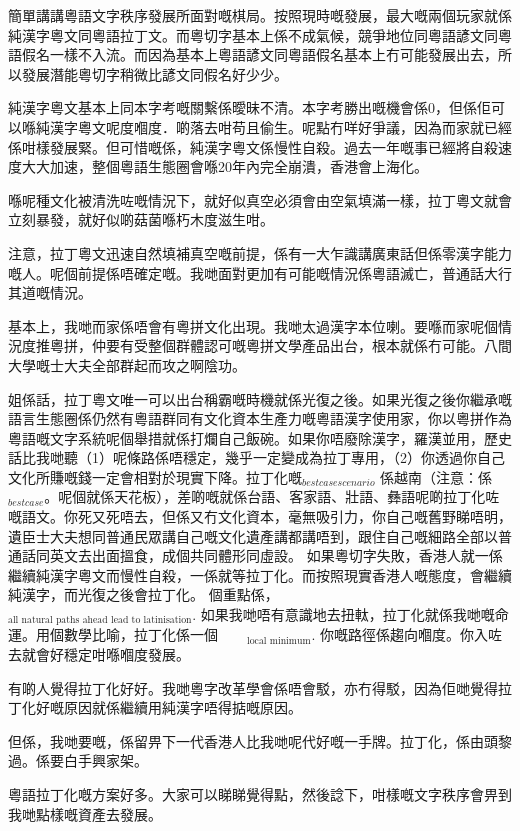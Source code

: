 \documentclass[a5paper, 10pt, openany]{book} %
\begin{document}
簡單講講粵語文字秩序發展所面對嘅棋局。按照現時嘅發展，最大嘅兩個玩家就係純漢字粵文同粵語拉丁文。而粵切字基本上係不成氣候，競爭地位同粵語諺文同粵語假名一樣不入流。而因為基本上粵語諺文同粵語假名基本上冇可能發展出去，所以發展潛能粵切字稍微比諺文同假名好少少。

純漢字粵文基本上同本字考嘅關繫係曖昧不清。本字考勝出嘅機會係0，但係佢可以喺純漢字粵文呢度嗰度．啲落去咁苟且偷生。呢點冇咩好爭議，因為而家就已經係咁樣發展緊。但可惜嘅係，純漢字粵文係慢性自殺。過去一年嘅事已經將自殺速度大大加速，整個粵語生態圈會喺20年內完全崩潰，香港會上海化。

喺呢種文化被清洗咗嘅情況下，就好似真空必須會由空氣填滿一樣，拉丁粵文就會立刻暴發，就好似啲菇菌喺朽木度滋生咁。

注意，拉丁粵文迅速自然填補真空嘅前提，係有一大乍識講廣東話但係零漢字能力嘅人。呢個前提係唔確定嘅。我哋面對更加有可能嘅情況係粵語滅亡，普通話大行其道嘅情況。

基本上，我哋而家係唔會有粵拼文化出現。我哋太過漢字本位喇。要喺而家呢個情況度推粵拼，仲要有受整個群體認可嘅粵拼文學產品出台，根本就係冇可能。八間大學嘅士大夫全部群起而攻之啊陰功。

姐係話，拉丁粵文唯一可以出台稱霸嘅時機就係光復之後。如果光復之後你繼承嘅語言生態圈係仍然有粵語群同有文化資本生產力嘅粵語漢字使用家，你以粵拼作為粵語嘅文字系統呢個舉措就係打爛自己飯碗。如果你唔廢除漢字，羅漢並用，歷史話比我哋聽（1）呢條路係唔穩定，幾乎一定變成為拉丁專用，（2）你透過你自己文化所賺嘅錢一定會相對於現實下降。拉丁化嘅$_{best case scenario}$ 係越南（注意：係 $_{best case}$。呢個就係天花板），差啲嘅就係台語、客家語、壯語、彝語呢啲拉丁化咗嘅語文。你死又死唔去，但係又冇文化資本，毫無吸引力，你自己嘅舊野睇唔明，遺臣士大夫想同普通民眾講自己嘅文化遺產講都講唔到，跟住自己嘅細路全部以普通話同英文去出面搵食，成個共同體形同虛設。
如果粵切字失敗，香港人就一係繼續純漢字粵文而慢性自殺，一係就等拉丁化。而按照現實香港人嘅態度，會繼續純漢字，而光復之後會拉丁化。
個重點係，     $_{\text{all natural paths ahead lead to latinisation}}$. 如果我哋唔有意識地去扭軚，拉丁化就係我哋嘅命運。用個數學比喻，拉丁化係一個  $_{\text{local minimum}}$. 你嘅路徑係趨向嗰度。你入咗去就會好穩定咁喺嗰度發展。

有啲人覺得拉丁化好好。我哋粵字改革學會係唔會駁，亦冇得駁，因為佢哋覺得拉丁化好嘅原因就係繼續用純漢字唔得掂嘅原因。

但係，我哋要嘅，係留畀下一代香港人比我哋呢代好嘅一手牌。拉丁化，係由頭黎過。係要白手興家架。

粵語拉丁化嘅方案好多。大家可以睇睇覺得點，然後諗下，咁樣嘅文字秩序會畀到我哋點樣嘅資產去發展。
\end{document}
